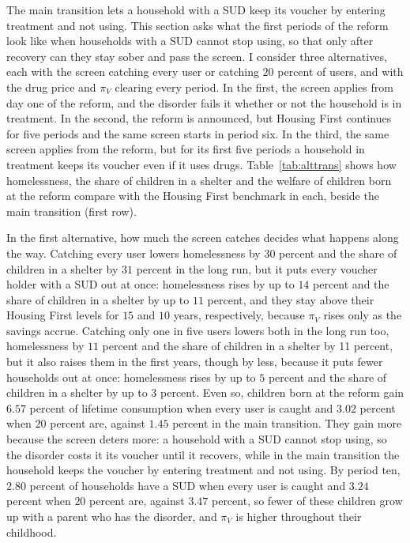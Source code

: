 \documentclass[10pt]{article}
\begin{document}
The main transition lets a household with a SUD keep its voucher by entering treatment and not using. This section asks what the first periods of the reform look like when households with a SUD cannot stop using, so that only after recovery can they stay sober and pass the screen. I consider three alternatives, each with the screen catching every user or catching $20$ percent of users, and with the drug price and $\pi_V$ clearing every period. In the first, the screen applies from day one of the reform, and the disorder fails it whether or not the household is in treatment. In the second, the reform is announced, but Housing First continues for five periods and the same screen starts in period six. In the third, the same screen applies from the reform, but for its first five periods a household in treatment keeps its voucher even if it uses drugs. Table~\ref{tab:alttrans} shows how homelessness, the share of children in a shelter and the welfare of children born at the reform compare with the Housing First benchmark in each, beside the main transition (first row).




In the first alternative, how much the screen catches decides what happens along the way. Catching every user lowers homelessness by $30$ percent and the share of children in a shelter by $31$ percent in the long run, but it puts every voucher holder with a SUD out at once: homelessness rises by up to $14$ percent and the share of children in a shelter by up to $11$ percent, and they stay above their Housing First levels for $15$ and $10$ years, respectively, because $\pi_V$ rises only as the savings accrue. Catching only one in five users lowers both in the long run too, homelessness by $11$ percent and the share of children in a shelter by 11 percent, but it also raises them in the first years, though by less, because it puts fewer households out at once:  homelessness rises by up to $5$ percent and the share of children in a shelter by up to $3$ percent. Even so, children born at the reform gain $6.57$ percent of lifetime consumption when every user is caught and $3.02$ percent when $20$ percent are, against $1.45$ percent in the main transition. They gain more because the screen deters more: a household with a SUD cannot stop using, so the disorder costs it its voucher until it recovers, while in the main transition the household keeps the voucher by entering treatment and not using. By period ten, $2.80$ percent of households have a SUD when every user is caught and $3.24$ percent when $20$ percent are, against $3.47$ percent, so fewer of these children grow up with a parent who has the disorder, and $\pi_V$ is higher throughout their childhood.
\end{document}
